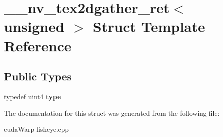 \hypertarget{struct____nv__tex2dgather__ret_3_01unsigned_01_4}{}\section{\+\_\+\+\_\+nv\+\_\+tex2dgather\+\_\+ret$<$ unsigned $>$ Struct Template Reference}
\label{struct____nv__tex2dgather__ret_3_01unsigned_01_4}
\subsection*{Public Types}
\begin{DoxyCompactItemize}
\item 
typedef uint4 {\bfseries type}\hypertarget{struct____nv__tex2dgather__ret_3_01unsigned_01_4_a23bcdcd3bc60e68ef2ccd6c87f738aa5}{}\label{struct____nv__tex2dgather__ret_3_01unsigned_01_4_a23bcdcd3bc60e68ef2ccd6c87f738aa5}

\end{DoxyCompactItemize}


The documentation for this struct was generated from the following file\+:\begin{DoxyCompactItemize}
\item 
cuda\+Warp-\/fisheye.\+cpp\end{DoxyCompactItemize}
